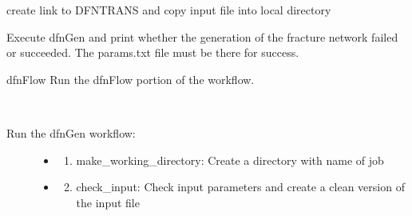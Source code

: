 \documentclass[letterpaper,10pt,english]{sphinxmanual}
\begin{document}
\begin{fulllineitems}
\begin{fulllineitems}
\end{fulllineitems}


\begin{fulllineitems}
\label{pydfnworks:pydfnworks.DFNWORKS.copy_dfn_trans_files}
create link to DFNTRANS and copy input file into local directory

\end{fulllineitems}


\begin{fulllineitems}
\label{pydfnworks:pydfnworks.DFNWORKS.create_network}
Execute dfnGen and print whether the generation of the fracture network failed or succeeded. The params.txt file must be there for success.

\end{fulllineitems}


\begin{fulllineitems}
\label{pydfnworks:pydfnworks.DFNWORKS.dfn_flow}
dfnFlow
Run the dfnFlow portion of the workflow.

\end{fulllineitems}


\begin{fulllineitems}
\label{pydfnworks:pydfnworks.DFNWORKS.dfn_gen}~\begin{description}
\item[{Run the dfnGen workflow: }] \leavevmode\begin{itemize}
\item {} \begin{enumerate}
\item {} 
make\_working\_directory: Create a directory with name of job

\end{enumerate}

\item {} \begin{enumerate}
\setcounter{enumi}{1}
\item {} 
check\_input: Check input parameters and create a clean version of the input file


\end{enumerate}
\end{itemize}
\end{description}
\end{fulllineitems}
\end{fulllineitems}
\end{document}
